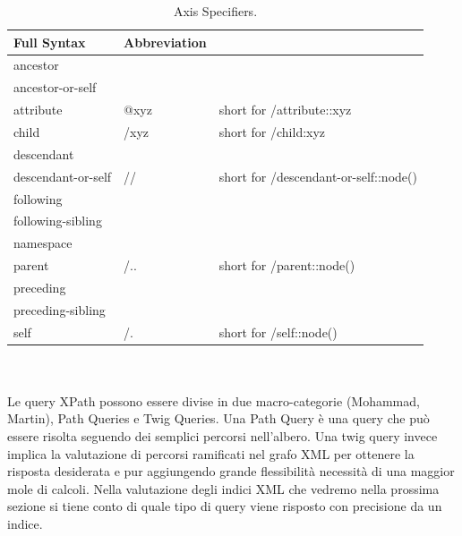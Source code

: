 \begin{table}[h]
  \caption{Axis Specifiers. \label{axistab}}
    \begin{tabular}{|l|l|l|}
      \hline
        Full Syntax        & Abbreviation & ~                                     \\ \hline
        ancestor           & ~            & ~                                     \\ 
        ancestor-or-self   & ~            & ~                                     \\ 
        attribute          & @xyz         & short for /attribute::xyz             \\ 
        child              & /xyz         & short for /child:xyz                  \\ 
        descendant         & ~            & ~                                     \\ 
        descendant-or-self & //           & short for /descendant-or-self::node() \\ 
        following          & ~            & ~                                     \\ 
        following-sibling  & ~            & ~                                     \\ 
        namespace          & ~            & ~                                     \\ 
        parent             & /..          & short for /parent::node()             \\ 
        preceding          & ~            & ~                                     \\ 
        preceding-sibling  & ~            & ~                                     \\ 
        self               & /.           & short for /self::node()               \\
      \hline
    \end{tabular}
\end{table}
\\\\
Le query XPath possono essere divise in due macro-categorie (Mohammad, Martin), Path Queries e Twig Queries. Una Path Query è una query che può essere risolta seguendo dei semplici percorsi nell'albero. Una twig query invece implica la valutazione di percorsi ramificati nel grafo XML per ottenere la risposta desiderata e pur aggiungendo grande flessibilità necessità di una maggior mole di calcoli. Nella valutazione degli indici XML che vedremo nella prossima sezione si tiene conto di quale tipo di query viene risposto con precisione da un indice.\\

